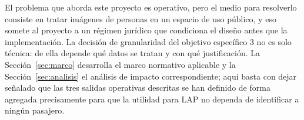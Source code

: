 El problema que aborda este proyecto es operativo, pero el medio para
resolverlo consiste en tratar imágenes de personas en un espacio de uso
público, y eso somete al proyecto a un régimen jurídico que condiciona
el diseño antes que la implementación. La decisión de granularidad del
objetivo específico 3 no es solo técnica: de ella depende qué datos se
tratan y con qué justificación. La Sección~\ref{sec:marco} desarrolla el
marco normativo aplicable y la Sección~\ref{sec:analisis} el análisis de
impacto correspondiente; aquí basta con dejar señalado que las tres
salidas operativas descritas se han definido de forma agregada
precisamente para que la utilidad para LAP no dependa de identificar a
ningún pasajero.
